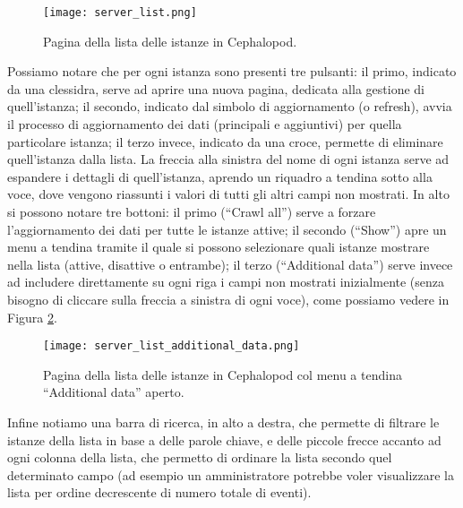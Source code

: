         	\begin{figure}[h!]
        		\begin{center}
        			\texttt{[image: server\_list.png]}
        		\end{center}
        		\caption[Lista delle istanze]{Pagina della lista delle istanze in Cephalopod.}
        		\label{fig:server_list}
        	\end{figure}
        	
        	Possiamo notare che per ogni istanza sono presenti tre pulsanti: il primo, indicato da una clessidra, serve ad aprire una nuova pagina, dedicata alla gestione di quell'istanza; il secondo, indicato dal simbolo di aggiornamento (o refresh), avvia il processo di aggiornamento dei dati (principali e aggiuntivi) per quella particolare istanza; il terzo invece, indicato da una croce, permette di eliminare quell'istanza dalla lista. La freccia alla sinistra del nome di ogni istanza serve ad espandere i dettagli di quell'istanza, aprendo un riquadro a tendina sotto alla voce, dove vengono riassunti i valori di tutti gli altri campi non mostrati. In alto si possono notare tre bottoni: il primo (``Crawl all'') serve a forzare l'aggiornamento dei dati per tutte le istanze attive; il secondo (``Show'') apre un menu a tendina tramite il quale si possono selezionare quali istanze mostrare nella lista (attive, disattive o entrambe); il terzo (``Additional data'') serve invece ad includere direttamente su ogni riga i campi non mostrati inizialmente (senza bisogno di cliccare sulla freccia a sinistra di ogni voce), come possiamo vedere in Figura \ref{fig:server_list_additional_data}.
        	
        	\begin{figure}[h!]
        		\begin{center}
        			\texttt{[image: server\_list\_additional\_data.png]}
        		\end{center}
        		\caption[Lista delle istanze (con menu a tendina aperto)]{Pagina della lista delle istanze in Cephalopod col menu a tendina ``Additional data'' aperto.}
        		\label{fig:server_list_additional_data}
        	\end{figure}
        	
        	Infine notiamo una barra di ricerca, in alto a destra, che permette di filtrare le istanze della lista in base a delle parole chiave, e delle piccole frecce accanto ad ogni colonna della lista, che permetto di ordinare la lista secondo quel determinato campo (ad esempio un amministratore potrebbe voler visualizzare la lista per ordine decrescente di numero totale di eventi).
        	
